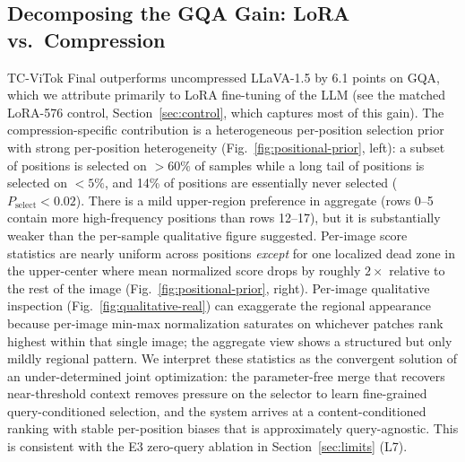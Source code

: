 \documentclass{article}
\begin{document}
\begin{table}[t]
\caption{Adaptive budget operating points. $k_{\mathrm{eff}}$ is the mean soft token count;
hard selection is capped at $k_{\max}{=}288$. Only $\lambda_b{=}0.10$ was measured;
we report it as a single design exploration rather than a Pareto sweep
(see Section~\ref{sec:limits}).}
\label{tab:pareto}
\vskip 0.1in
\centering
{}
\end{table}

\subsection{Decomposing the GQA Gain: LoRA vs.\ Compression}
\label{sec:hypotheses}
\label{sec:gqa-mechanism}

TC-ViTok Final outperforms uncompressed LLaVA-1.5 by 6.1 points on GQA, which
we attribute primarily to LoRA fine-tuning of the LLM (see the matched
LoRA-576 control, Section~\ref{sec:control}, which captures most of this
gain). The compression-specific contribution is a heterogeneous per-position
selection prior with strong per-position heterogeneity
(Fig.~\ref{fig:positional-prior}, left): a subset of positions is selected
on $>\!60\%$ of samples while a long tail of positions is selected on
$<\!5\%$, and 14\% of positions are essentially never selected
($P_\text{select}\!<\!0.02$). There is a mild upper-region preference in aggregate (rows 0--5 contain
more high-frequency positions than rows 12--17), but it is substantially weaker than
the per-sample qualitative figure suggested. Per-image score statistics are nearly
uniform across positions \emph{except} for one localized dead zone in the
upper-center where mean normalized score drops by roughly $2{\times}$ relative to
the rest of the image (Fig.~\ref{fig:positional-prior}, right).
Per-image qualitative inspection (Fig.~\ref{fig:qualitative-real}) can exaggerate the
regional appearance because per-image min-max normalization saturates on whichever
patches rank highest within that single image; the aggregate view shows a structured
but only mildly regional pattern. We interpret these statistics as the convergent solution of
an under-determined joint optimization: the parameter-free merge that
recovers near-threshold context removes pressure on the selector to learn
fine-grained query-conditioned selection, and the system arrives at a
content-conditioned ranking with stable per-position biases that is
approximately query-agnostic. This is consistent with the E3 zero-query
ablation in Section~\ref{sec:limits} (L7).
\end{document}
